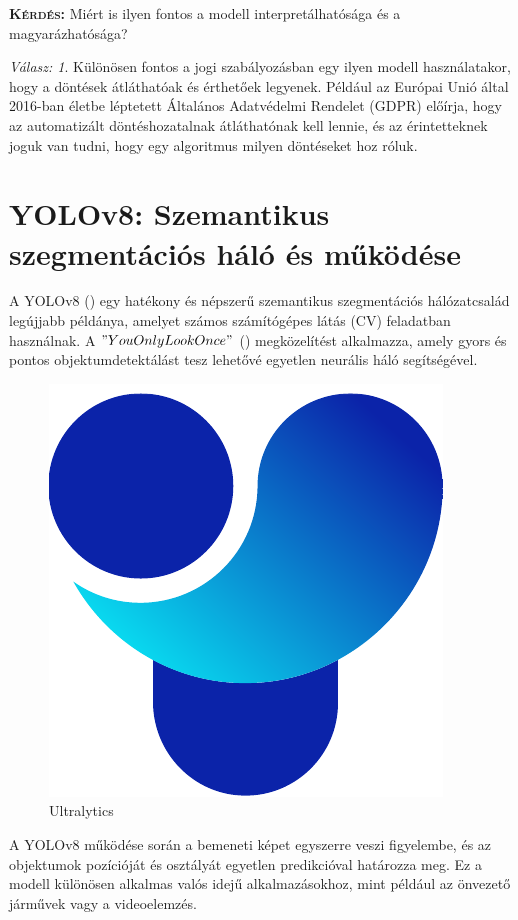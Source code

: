 \documentclass[12pt,oneside,a4paper]{article}
\newcommand{\newsection}[1]{\clearpage\section{#1}}\label{makro}
\theoremstyle{remark}
\newtheorem*{remarkth}{Válasz: \newline}
\newenvironment{remark}{\begin{remarkth}}{\end{remarkth}}
\newenvironment{kerdes}{
    \medskip%
    \par\noindent\ignorespaces%
    \textsc{\textbf{Kérdés: }}%
    \medskip
    \textsf%
        }{%
        \medskip
}
\begin{document}
\begin{kerdes}
    Miért is ilyen fontos a modell interpretálhatósága és a magyarázhatósága?
\end{kerdes}
\begin{remark}
    Különösen fontos a jogi szabályozásban egy ilyen modell használatakor, hogy a döntések átláthatóak és
    érthetőek legyenek.
    Például az Európai Unió által 2016-ban életbe léptetett Általános Adatvédelmi Rendelet (GDPR) előírja, hogy az
    automatizált döntéshozatalnak átláthatónak kell lennie, és az érintetteknek joguk van tudni, hogy egy algoritmus
    milyen döntéseket hoz róluk.
\end{remark}
\newsection{YOLOv8: Szemantikus szegmentációs háló és működése}\label{sec:yolov8:-szemantikus-szegmentacios-halo}
    A YOLOv8 (\cite{Yolov8})\label{irodalomhivatkozas} egy hatékony és népszerű szemantikus szegmentációs hálózatcsalád legújjabb példánya,
    amelyet számos számítógépes látás (\ac{CV})
    feladatban használnak.
    A \("You Only Look Once"\) () megközelítést alkalmazza,
amely gyors és pontos objektumdetektálást tesz lehetővé egyetlen neurális háló segítségével.

\begin{figure}
  \centering
  \includegraphics[width=\linewidth]{Ultralytics}
  \caption{Ultralytics}
  \label{fig:Ultralytics}
\end{figure}
    A YOLOv8 működése során a bemeneti képet egyszerre veszi figyelembe, és az objektumok pozícióját
és osztályát egyetlen predikcióval határozza meg.
Ez a modell különösen alkalmas valós
idejű alkalmazásokhoz, mint például az önvezető járművek vagy a videoelemzés.
\end{document}
